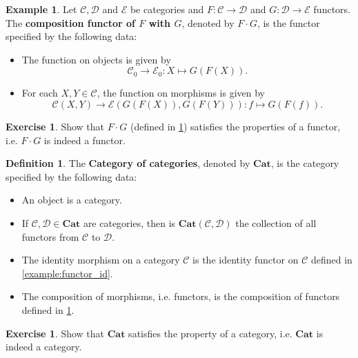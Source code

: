 \documentclass[a4paper,10pt]{scrartcl}
\theoremstyle{plain}
\theoremstyle{definition}
\newtheorem{dfn}[thm]{Definition}
\newtheorem{exa}[thm]{Example}
\newtheorem{exer}[thm]{Exercise}
\newcommand{\Cat}[1]{\mathcal{#1}}
\newcommand{\CC}{\Cat{C}}
\newcommand{\DD}{\Cat{D}}
\newcommand{\EE}{\Cat{E}}
\newcommand{\Catb}[1]{\mathbf{#1}}
\newcommand{\CAT}{\Catb{Cat}}
\newcommand{\Ob}[1]{{#1}_0}
\newcommand{\CHom}[3]{{#1}(#2,#3)}
\newcommand{\Comp}{\cdot}
\begin{document}
\begin{exa}\label{example:functor_comp} Let $\CC,\DD$ and $\EE$ be  categories and $F:\CC\to\DD$ and $G:\DD\to\EE$ functors. The \textbf{composition functor of $F$ with $G$}, denoted by $F\Comp G$, is the functor specified by the following data:
\begin{itemize}
\item The function on objects is given by
\[
\Ob{\CC}\to \Ob{\EE}: X\mapsto G(F(X)).
\]
\item For each $X,Y\in\CC$, the function on morphisms is given by
\[
\CHom \CC X Y\to \CHom{\EE}{G(F(X))}{G(F(Y))}: f\mapsto G(F(f)).
\]
\end{itemize}
\end{exa}

\begin{exer} Show that $F\Comp G$ (defined in \cref{example:functor_comp}) satisfies the properties of a functor, i.e. $F\Comp G$ is indeed a functor.
\end{exer}

\begin{dfn} The \textbf{Category of categories}, denoted by $\CAT$, is the category specified by the following data:
\begin{itemize}
\item An object is a category.
\item If $\CC, \DD\in\CAT$ are categories, then is $\CHom \CAT \CC \DD$ the collection of all functors from $\CC$ to $\DD$.
\item The identity morphism on a category $\CC$ is the identity functor on $\CC$ defined in \cref{example:functor_id}.
\item The composition of morphisms, i.e. functors, is the composition of functors defined in \cref{example:functor_comp}.
\end{itemize} 
\end{dfn}

\begin{exer} Show that $\CAT$ satisfies the property of a category, i.e. $\CAT$ is indeed a category.
\end{exer}
\end{document}
